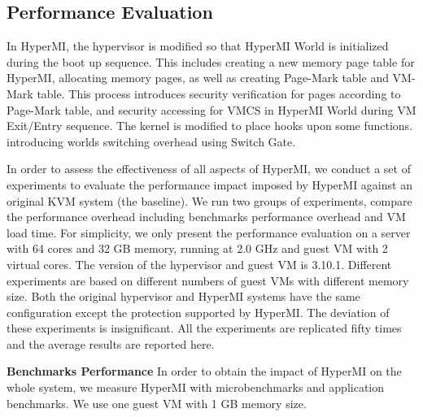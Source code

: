 \documentclass[conference]{IEEEtran}
\begin{document}
\subsection{Performance Evaluation}

In HyperMI, the hypervisor is modified so that HyperMI World is initialized during the boot up sequence. This includes creating a new memory page table for HyperMI, allocating memory pages, as well as creating Page-Mark table and VM-Mark table. This process introduces security verification for pages according to Page-Mark table, and security accessing for VMCS in HyperMI World during VM Exit/Entry sequence.
The kernel is modified to place hooks upon some functions.
introducing worlds switching overhead using Switch Gate.

In order to assess the effectiveness of all aspects of HyperMI, we conduct a set of experiments to evaluate the performance impact imposed by HyperMI against an original KVM system (the baseline). We run two groups of experiments, compare the performance overhead including benchmarks performance overhead and VM load time.
For simplicity, we only present the performance evaluation on a server with 64 cores and 32 GB memory, running at 2.0 GHz and guest VM with 2 virtual cores. The version of the hypervisor and guest VM is 3.10.1. Different experiments are based on different numbers of guest VMs with different memory size. Both the original hypervisor and HyperMI systems have the same configuration except the protection supported by HyperMI. The deviation of these experiments is insignificant. All the experiments are replicated fifty times and the average results are reported here.



\textbf{Benchmarks Performance}
In order to obtain the impact of HyperMI on the whole system, we measure HyperMI with microbenchmarks and application benchmarks. 
We use one guest VM with 1 GB memory size. 
\end{document}
